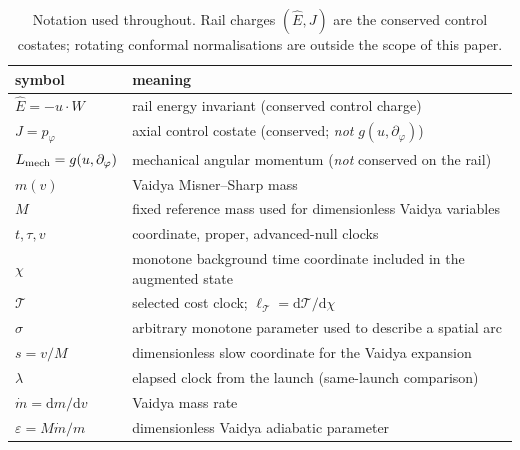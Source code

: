 \documentclass[12pt]{iopart}
\newcommand{\Ehat}{\hat E}
\newcommand{\dd}{\mathrm{d}}
\theoremstyle{plain}
\theoremstyle{definition}
\theoremstyle{plain}
\theoremstyle{remark}
\begin{document}
\begin{table}[htbp]
    \centering\small
    \caption{Notation used throughout. Rail charges $(\Ehat,J)$ are the conserved control
    costates; rotating conformal normalisations are outside the scope of this paper.}
    \label{tab:notation}
    \begin{tabular}{@{}ll@{}}
        \hline\hline
        symbol & meaning\\
        \hline
        $\Ehat=-u\cdot W$ & rail energy invariant (conserved control charge)\\
        $J=p_\varphi$ & axial control costate (conserved; \emph{not} $g(u,\partial_\varphi)$)\\
        $L_{\rm mech}=g(u,\partial_\varphi)$ & mechanical angular momentum (\emph{not} conserved on the rail)\\
        $m(v)$ & Vaidya Misner--Sharp mass\\
        $M$ & fixed reference mass used for dimensionless Vaidya variables\\
        $t,\tau,v$ & coordinate, proper, advanced-null clocks\\
        $\chi$ & monotone background time coordinate included in the augmented state\\
        $\mathcal T$ & selected cost clock; $\ell_{\mathcal T}=\dd\mathcal T/\dd\chi$\\
        $\sigma$ & arbitrary monotone parameter used to describe a spatial arc\\
        $s=v/M$ & dimensionless slow coordinate for the Vaidya expansion\\
        $\lambda$ & elapsed clock from the launch (same-launch comparison)\\
        $\dot m=\dd m/\dd v$ & Vaidya mass rate\\
        $\varepsilon=M\dot m/m$ & dimensionless Vaidya adiabatic parameter\\
        \hline\hline
    \end{tabular}
\end{table}
\end{document}
